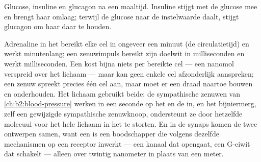 \begin{omfigure}

{\small Glucose, insuline en glucagon na een maaltijd. Insuline stijgt met de
glucose mee en brengt haar omlaag; terwijl de glucose naar de instelwaarde
daalt, stijgt glucagon om haar daar te houden.}
\end{omfigure}

\begin{example}\label{ex:b2:cell-signalling:compare}
Adrenaline in het  bereikt elke cel in ongeveer een minuut (de
circulatietijd) en werkt minutenlang; een zenuwimpuls bereikt zijn doelwit in
milliseconden en werkt milliseconden. Een  kost bijna niets per
bereikte cel --- een nanomol verspreid over het lichaam --- maar kan geen
enkele cel afzonderlijk aanspreken; een zenuw spreekt precies één cel aan,
maar moet er een draad naartoe bouwen en onderhouden. Het lichaam gebruikt
beide: de sympathische zenuwen van \cref{ch:b2:blood-pressure} werken in een
seconde op het  en de  in, en het bijniermerg, zelf een
gewijzigde sympathische zenuwknoop, ondersteunt ze door hetzelfde molecuul
voor het hele lichaam in het  te storten. En in de synaps komen de twee
ontwerpen samen, want een  is een boodschapper die volgens
dezelfde mechanismen op een receptor inwerkt --- een kanaal dat opengaat,
een G-eiwit dat schakelt --- alleen over twintig nanometer in plaats van een
meter.
\end{example}

